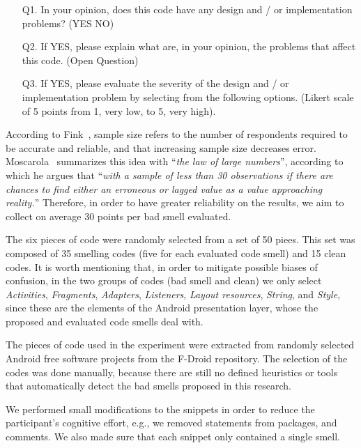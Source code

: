 \begin{itemize}

	\item[Q1.] 
	In your opinion, does this code have any design and / or implementation problems? (YES NO)

	\item[Q2.] If YES, please explain what are, in your opinion, the problems that affect this code. (Open Question)

	\item[Q3.] If YES, please evaluate the severity of the design and / or implementation problem by selecting from the following options. (Likert scale of 5 points from 1, very low, to 5, very high).

\end{itemize}


According to Fink~\cite{Fink:95}, sample size refers to the number of respondents required to be accurate and reliable, and that increasing sample size decreases error. Moscarola~\cite{Moscarola:90} summarizes this idea with ``\textit{the law of large numbers}'', according to which he argues that ``\textit{with a sample of less than 30 observations if there are chances to find either an erroneous or lagged value as a value approaching reality.}'' Therefore, in order to have greater reliability on the results, we aim to collect on average 30 points per bad smell evaluated.


The six pieces of code were randomly selected from a set of 50 piees. This set was composed of 35 smelling codes (five for each evaluated code smell) and 15 clean codes. It is worth mentioning that, in order to mitigate possible biases of confusion, in the two groups of codes (bad smell and clean) we only select \textit{Activities}, \textit{Fragments}, \textit{Adapters}, \textit{Listeners}, \textit{Layout resources}, \textit{String}, and \textit{Style}, since these are the elements of the Android presentation layer, whose the proposed and evaluated code smells deal with.

The pieces of code used in the experiment were extracted from randomly selected Android free software projects from the F-Droid repository. 
The selection of the codes was done manually, because there are still no defined heuristics or tools that automatically detect the bad smells proposed in this research.

We performed small modifications to the snippets in order to reduce the participant's cognitive effort, e.g., we removed statements from packages, and comments. We also made sure that each snippet only contained a single smell.

